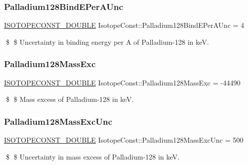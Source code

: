 \subsubsection{\texorpdfstring{Palladium128\+Bind\+E\+Per\+A\+Unc}{Palladium128BindEPerAUnc}}
{\footnotesize\ttfamily \mbox{\hyperlink{group___isotope_const-_macros_ga8f45a7272ce02c0b4c65c44636ed719a}{I\+S\+O\+T\+O\+P\+E\+C\+O\+N\+S\+T\+\_\+\+D\+O\+U\+B\+LE}} Isotope\+Const\+::\+Palladium128\+Bind\+E\+Per\+A\+Unc = 4}

\$ \$ Uncertainty in binding energy per A of Palladium-\/128 in keV. \mbox{\label{group___isotope_const-_palladium-_pd128_ga7eeb05ef5032eeea2fb333b362edf041}} 
\subsubsection{\texorpdfstring{Palladium128\+Mass\+Exc}{Palladium128MassExc}}
{\footnotesize\ttfamily \mbox{\hyperlink{group___isotope_const-_macros_ga8f45a7272ce02c0b4c65c44636ed719a}{I\+S\+O\+T\+O\+P\+E\+C\+O\+N\+S\+T\+\_\+\+D\+O\+U\+B\+LE}} Isotope\+Const\+::\+Palladium128\+Mass\+Exc = -\/44490}

\$ \$ Mass excess of Palladium-\/128 in keV. \mbox{\label{group___isotope_const-_palladium-_pd128_gaebb158f7ff26c937cf169be3fd5afb4e}} 
\subsubsection{\texorpdfstring{Palladium128\+Mass\+Exc\+Unc}{Palladium128MassExcUnc}}
{\footnotesize\ttfamily \mbox{\hyperlink{group___isotope_const-_macros_ga8f45a7272ce02c0b4c65c44636ed719a}{I\+S\+O\+T\+O\+P\+E\+C\+O\+N\+S\+T\+\_\+\+D\+O\+U\+B\+LE}} Isotope\+Const\+::\+Palladium128\+Mass\+Exc\+Unc = 500}

\$ \$ Uncertainty in mass excess of Palladium-\/128 in keV. \mbox{\label{group___isotope_const-_palladium-_pd128_gad8792c946bdc3ebdbd958a25324c1986}} 

